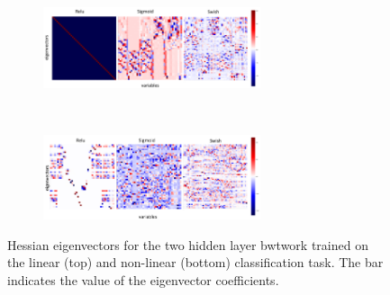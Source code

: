 \documentclass{article}
\begin{document}
\begin{figure}[t!]
\centering
\begin{subfigure}[]{}
  \includegraphics[width= 0.7\textwidth]{eigen_lin.pdf}
  \label{fig:eigvect}
\end{subfigure}
~
\begin{subfigure}[]{}
  \includegraphics[width= 0.7\textwidth]{eigen_nl.pdf}
  \label{fig:eigvect2}
\end{subfigure}
\caption{  Hessian eigenvectors for the two hidden layer bwtwork trained on the linear (top) and non-linear (bottom) classification task. The bar indicates the value of the eigenvector coefficients.}
\end{figure}




\end{document}
